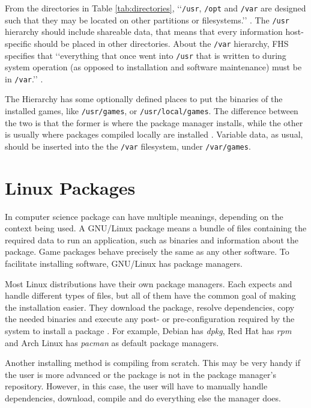 From the directories in Table \ref{tab:directories}, \lq\lq \texttt{/usr}, \texttt{/opt} and \texttt{/var} are designed such that they may be located on other partitions or filesystems.\rq\rq{} \cite{allbery2015filesystem}. The \texttt{/usr} hierarchy should include shareable data, that means that every information host-specific should be placed in other directories. About the \texttt{/var} hierarchy, FHS specifies that \lq\lq everything that once went into \texttt{/usr} that is written to during system operation (as opposed to installation and software maintenance) must be in \texttt{/var}.\rq\rq{} \cite{allbery2015filesystem}.

The Hierarchy has some optionally defined places to put the binaries of the installed games, like \texttt{/usr/games}, or \texttt{/usr/local/games}. The difference between the two is that the former is where the package manager installs, while the other is usually where packages compiled locally are installed \cite{blfsdevelopmentteam2017}. Variable data, as usual, should be inserted into the the \texttt{/var} filesystem, under \texttt{/var/games}.


\section{Linux Packages}
\label {sec:packages}

In computer science package can have multiple meanings, depending on the context being used. A GNU/Linux package means a bundle of files containing the required data to run an application, such as binaries and information about the package. Game packages behave precisely the same as any other software. To facilitate installing software, GNU/Linux has package managers.

Most Linux distributions have their own package managers. Each expects and handle different types of files, but all of them have the common goal of making the installation easier. They download the package, resolve dependencies, copy the needed binaries and execute any post- or pre-configuration required by the system to install a package \cite{linode2017linux}. For example, Debian has \textit{dpkg}, Red Hat has \textit{rpm} and Arch Linux has \textit{pacman} as default package managers.

Another installing method is compiling from scratch. This may be very handy if the user is more advanced or the package is not in the package manager's repository. However, in this case, the user will have to manually handle dependencies, download, compile and do everything else the manager does.


